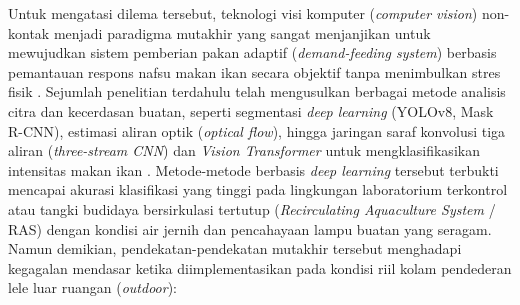 Untuk mengatasi dilema tersebut, teknologi visi komputer (\textit{computer vision}) non-kontak menjadi paradigma mutakhir yang sangat menjanjikan untuk mewujudkan sistem pemberian pakan adaptif (\textit{demand-feeding system}) berbasis pemantauan respons nafsu makan ikan secara objektif tanpa menimbulkan stres fisik \cite{Al-Abri2025,Yang2025}. Sejumlah penelitian terdahulu telah mengusulkan berbagai metode analisis citra dan kecerdasan buatan, seperti segmentasi \textit{deep learning} (YOLOv8, Mask R-CNN), estimasi aliran optik (\textit{optical flow}), hingga jaringan saraf konvolusi tiga aliran (\textit{three-stream CNN}) dan \textit{Vision Transformer} untuk mengklasifikasikan intensitas makan ikan \cite{Qian2025,Dong2024,Wu2024,Zhang2024,Fukae2023}. Metode-metode berbasis \textit{deep learning} tersebut terbukti mencapai akurasi klasifikasi yang tinggi pada lingkungan laboratorium terkontrol atau tangki budidaya bersirkulasi tertutup (\textit{Recirculating Aquaculture System} / RAS) dengan kondisi air jernih dan pencahayaan lampu buatan yang seragam. Namun demikian, pendekatan-pendekatan mutakhir tersebut menghadapi kegagalan mendasar ketika diimplementasikan pada kondisi riil kolam pendederan lele luar ruangan (\textit{outdoor}):
